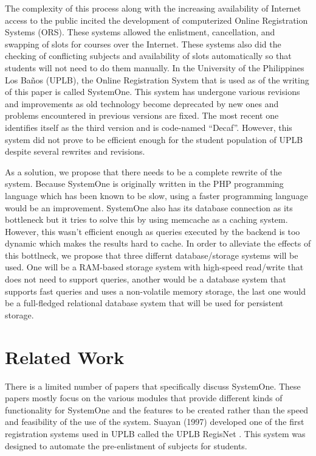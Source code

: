 \documentclass{sigchi}
\begin{document}
The complexity of this process along with the increasing availability of Internet access to
the public incited the development of computerized Online Registration Systems (ORS). These
systems allowed the enlistment, cancellation, and swapping of slots for courses over the Internet.
These systems also did the checking of conflicting subjects and availability of slots automatically
so that students will not need to do them manually.
In the University of the Philippines Los Baños (UPLB), the Online Registration System that
is used as of the writing of this paper is called SystemOne. This system has undergone various
revisions and improvements as old technology become deprecated by new ones and problems
encountered in previous versions are fixed. The most recent one identifies itself as the third
version and is code-named “Decaf”. However, this system did not prove to be efficient enough
for the student population of UPLB despite several rewrites and revisions.

As a solution, we propose that there needs to be a complete rewrite of 
the system. Because SystemOne is originally written in the PHP programming 
language which has been known to be slow, using a faster programming language 
would be an improvement. SystemOne also has its database connection as its 
bottleneck but it tries to solve this by using memcache as a caching system. 
However, this wasn't efficient enough as queries executed by the backend is too
dynamic which makes the results hard to cache. In order to alleviate the effects
of this bottlneck, we propose that three differnt database/storage systems will
be used. One will be a RAM-based storage system with high-speed read/write that
does not need to support queries, another would be a database system that 
supports fast queries and uses a non-volatile memory storage, the last one would
be a full-fledged relational database system that will be used for persistent
storage.

\section{Related Work}

There is a limited number of papers that specifically discuss SystemOne. These papers
mostly focus on the various modules that provide different kinds of functionality for SystemOne
and the features to be created rather than the speed and feasibility of the use of the system.
Suayan (1997) developed one of the first registration systems used in UPLB called the
UPLB RegisNet \cite{suayan}. This system was designed to automate the pre-enlistment of subjects for
students.
\end{document}
